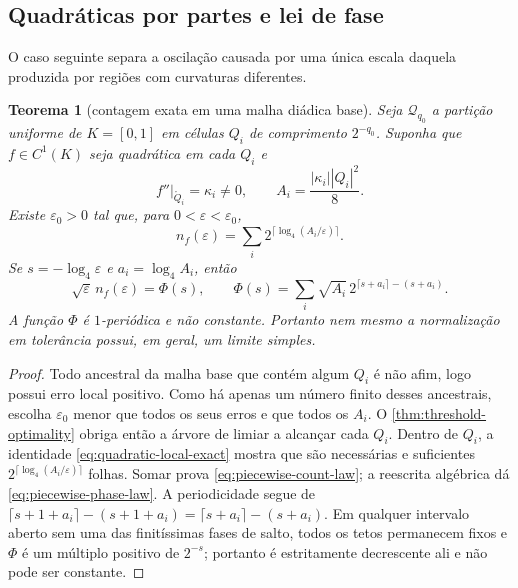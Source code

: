 \documentclass[11pt,a4paper]{article}
\newtheorem{theorem}{Teorema}[section]
\theoremstyle{definition}
\theoremstyle{remark}
\begin{document}
\subsection{Quadráticas por partes e lei de fase}

O caso seguinte separa a oscilação causada por uma única escala daquela
produzida por regiões com curvaturas diferentes.

\begin{theorem}[contagem exata em uma malha diádica base]
\label{thm:piecewise-quadratic-count}
Seja $\mathcal Q_{q_0}$ a partição uniforme de $K=[0,1]$ em células
$Q_i$ de comprimento $2^{-q_0}$. Suponha que $f\in C^1(K)$ seja quadrática
em cada $Q_i$ e
\[
 f''|_{\mathring Q_i}=\kappa_i\ne0,
 \qquad
 A_i=\frac{|\kappa_i||Q_i|^2}{8}.
\]
Existe $\varepsilon_0>0$ tal que, para
$0<\varepsilon<\varepsilon_0$,
\begin{equation}
 n_f(\varepsilon)
 =\sum_i2^{\lceil\log_4(A_i/\varepsilon)\rceil}.
 \label{eq:piecewise-count-law}
\end{equation}
Se $s=-\log_4\varepsilon$ e $a_i=\log_4A_i$, então
\begin{equation}
 \sqrt\varepsilon\,n_f(\varepsilon)
 =\Phi(s),
 \qquad
 \Phi(s)=\sum_i\sqrt{A_i}\,
 2^{\lceil s+a_i\rceil-(s+a_i)}.
 \label{eq:piecewise-phase-law}
\end{equation}
A função $\Phi$ é $1$-periódica e não constante. Portanto nem mesmo a
normalização em tolerância possui, em geral, um limite simples.
\end{theorem}

\begin{proof}
Todo ancestral da malha base que contém algum $Q_i$ é não afim, logo possui
erro local positivo. Como há apenas um número finito desses ancestrais,
escolha $\varepsilon_0$ menor que todos os seus erros e que todos os $A_i$.
O \cref{thm:threshold-optimality} obriga então a árvore de limiar a alcançar
cada $Q_i$. Dentro de $Q_i$, a identidade
\eqref{eq:quadratic-local-exact} mostra que são necessárias e suficientes
$2^{\lceil\log_4(A_i/\varepsilon)\rceil}$ folhas. Somar prova
\eqref{eq:piecewise-count-law}; a reescrita algébrica dá
\eqref{eq:piecewise-phase-law}. A periodicidade segue de
$\lceil s+1+a_i\rceil-(s+1+a_i)=\lceil s+a_i\rceil-(s+a_i)$.
Em qualquer intervalo aberto sem uma das finitíssimas fases de salto, todos
os tetos permanecem fixos e $\Phi$ é um múltiplo positivo de $2^{-s}$;
portanto é estritamente decrescente ali e não pode ser constante.
\end{proof}
\end{document}
